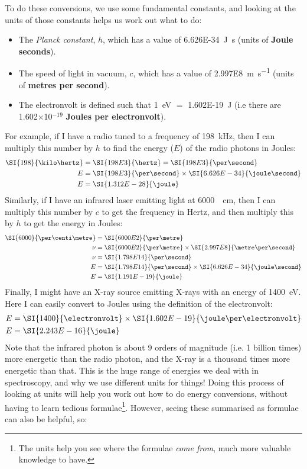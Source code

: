To do these conversions, we use some fundamental constants, and looking at the units of those constants helps us work out what to do:
\begin{itemize}
\item The \textit{Planck constant}, $h$, which has a value of \SI{6.626E-34}{\joule\second} (units of \textbf{Joule seconds}).
\item The speed of light in vacuum, $c$, which has a value of \SI{2.997E8}{\metre\per\second} (units of \textbf{metres per second}).
\item The electronvolt is defined such that \SI{1}{\electronvolt} $=$ \SI{1.602E-19}{\joule} (i.e there are 1.602$\times$10$^{-19}$ \textbf{Joules per electronvolt}).
\end{itemize}
For example, if I have a radio tuned to a frequency of \SI{198}{\kilo\hertz}, then I can multiply this number by $h$ to find the energy ($E$) of the radio photons in Joules:
\begin{align*}
\SI{198}{\kilo\hertz} &= \SI{198E3}{\hertz} = \SI{198E3}{\per\second} \\
E &= \SI{198E3}{\per\second} \times \SI{6.626E-34}{\joule\second} \\
E &= \SI{1.312E-28}{\joule}
\end{align*}
Similarly, if I have an infrared laser emitting light at \SI{6000}{\per\centi\metre}, then I can multiply this number by $c$ to get the frequency in Hertz, and then multiply this by $h$ to get the energy in Joules:
\begin{align*}
\SI{6000}{\per\centi\metre} &= \SI{6000E2}{\per\metre} \\
\nu &= \SI{6000E2}{\per\metre} \times \SI{2.997E8}{\metre\per\second} \\
\nu &= \SI{1.798E14}{\per\second} \\
E &= \SI{1.798E14}{\per\second} \times \SI{6.626E-34}{\joule\second} \\
E &= \SI{1.191E-19}{\joule}
\end{align*}
Finally, I might have an X-ray source emitting X-rays with an energy of \SI{1400}{\electronvolt}. Here I can easily convert to Joules using the definition of the electronvolt:
\begin{align*}
E &= \SI{1400}{\electronvolt} \times \SI{1.602E-19}{\joule\per\electronvolt} \\
E &= \SI{2.243E-16}{\joule}
\end{align*}
Note that the infrared photon is about 9 orders of magnitude (i.e. 1 billion times) more energetic  than the radio photon, and the X-ray is a thousand times more energetic than that. This is the huge range of energies we deal with in spectroscopy, and why we use different units for things! Doing this process of looking at units will help you work out how to do energy conversions, without having to learn tedious formulae\footnote{The units help you see where the formulae \textit{come from}, much more valuable knowledge to have.}. However, seeing these summarised as formulae can also be helpful, so:
